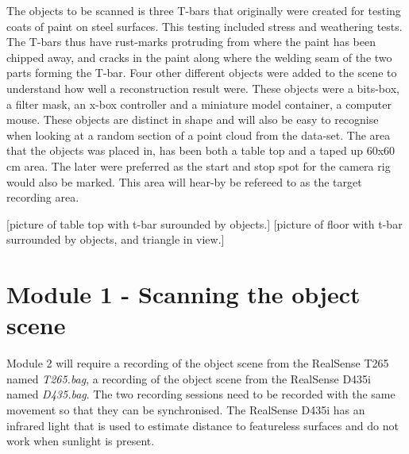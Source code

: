 The objects to be scanned is three T-bars that originally were created for testing coats of paint on steel surfaces. This testing included stress and weathering tests. The T-bars thus have rust-marks protruding from where the paint has been chipped away, and cracks in the paint along where the welding seam of the two parts forming the T-bar. Four other different objects were added to the scene to understand how well a reconstruction result were. These objects were a bits-box, a filter mask, an x-box controller and a miniature model container, a computer mouse. These objects are distinct in shape and will also be easy to recognise when looking at a random section of a point cloud from the data-set. The area that the objects was placed in, has been both a table top and a taped up 60x60 cm area. The later were preferred as the start and stop spot for the camera rig would also be marked. This area will hear-by be refereed to as the target recording area. 

[picture of table top with t-bar surounded by objects.]
[picture of floor with t-bar surrounded by objects, and triangle in view.]








\section{Module 1 - Scanning the object scene}

Module 2 will require a recording of the object scene from the RealSense T265 named \textit{T265.bag}, a recording of the object scene from the RealSense D435i named \textit{D435.bag}. The two recording sessions need to be recorded with the same movement so that they can be synchronised. The RealSense D435i has an infrared light that is used to estimate distance to featureless surfaces and do not work when sunlight is present.

